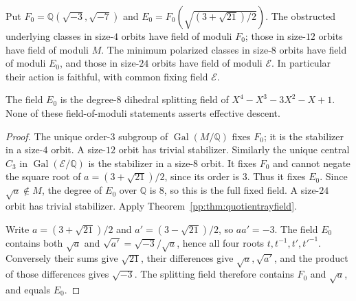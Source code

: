 \begin{corollary}
\label{pp:cor:obstructedmodulifields}
Put $F_0=\mathbb Q(\sqrt{-3},\sqrt{-7})$ and
$E_0=F_0(\sqrt{(3+\sqrt{21})/2})$.
The obstructed underlying classes in size-$4$ orbits have field of
moduli $F_0$; those in size-$12$ orbits have field of moduli $M$.
The minimum polarized classes in size-$8$ orbits have field of moduli
$E_0$, and those in size-$24$ orbits have field of moduli $\mathcal E$.
In particular their action is faithful, with common fixing field
$\mathcal E$.

The field $E_0$ is the degree-$8$ dihedral splitting field of
$X^4-X^3-3X^2-X+1$. None of these field-of-moduli statements
asserts effective descent.
\end{corollary}
\begin{proof}
The unique order-$3$ subgroup of $\operatorname{Gal}(M/\mathbb Q)$
fixes $F_0$; it is the stabilizer in a size-$4$ orbit. A size-$12$
orbit has trivial stabilizer. Similarly the unique central $C_3$
in $\operatorname{Gal}(\mathcal E/\mathbb Q)$ is the stabilizer in
a size-$8$ orbit. It fixes $F_0$ and cannot negate the square root
of $a=(3+\sqrt{21})/2$, since its order is $3$. Thus it fixes $E_0$.
Since $\sqrt a\notin M$, the degree of $E_0$ over $\mathbb Q$ is $8$,
so this is the full fixed field. A size-$24$ orbit has trivial stabilizer. Apply Theorem~\ref{pp:thm:quotientrayfield}.

Write $a=(3+\sqrt{21})/2$ and $a'=(3-\sqrt{21})/2$, so $aa'=-3$.
The field $E_0$ contains both $\sqrt a$ and
$\sqrt{a'}=\sqrt{-3}/\sqrt a$, hence all four roots
$t,t^{-1},t',t'^{-1}$. Conversely their sums give $\sqrt{21}$,
their differences give $\sqrt a,\sqrt{a'}$, and the product of
those differences gives $\sqrt{-3}$. The splitting field therefore
contains $F_0$ and $\sqrt a$, and equals $E_0$.
\end{proof}


